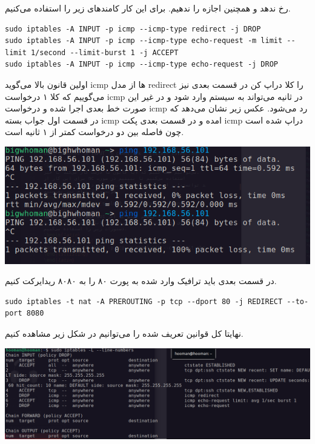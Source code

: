 رخ ندهد و همچنین اجازه  را ندهیم.
برای این کار کامندهای زیر را استفاده می‌کنیم.
\begin{latin}   
\begin{lstlisting}
sudo iptables -A INPUT -p icmp --icmp-type redirect -j DROP
sudo iptables -A INPUT -p icmp --icmp-type echo-request -m limit --limit 1/second --limit-burst 1 -j ACCEPT
sudo iptables -A INPUT -p icmp --icmp-type echo-request -j DROP
\end{lstlisting}
\end{latin}
اولین قانون بالا می‌گوید icmp ها از مدل redirect را کلا دراپ کن 
در قسمت بعدی نیز می‌گوییم که کلا ۱ درخواست icmp در ثانیه می‌تواند به سیستم وارد شود و در غیر این صورت 
خط بعدی اجرا شده و درخواست icmp رد می‌شود. 
عکس زیر نشان می‌دهد که در قسمت اول جواب بسته icmp امده و در قسمت 
بعدی پکت icmp دراپ شده است چون فاصله بین دو درخواست کمتر از ۱ ثانیه است.
\begin{center}
    \includegraphics[scale=0.35]{pics/iptables4.png}
\end{center}
در قسمت بعدی باید ترافیک وارد شده به پورت ۸۰ را به ۸۰۸۰ ریدایرکت کنیم.
\begin{latin}   
\begin{lstlisting}
sudo iptables -t nat -A PREROUTING -p tcp --dport 80 -j REDIRECT --to-port 8080
\end{lstlisting}
\end{latin}
نهایتا کل قوانین تعریف شده را می‌توانیم در شکل زیر مشاهده کنیم.
\begin{center}
    \includegraphics[scale=0.30]{pics/iptables5.png}
\end{center}